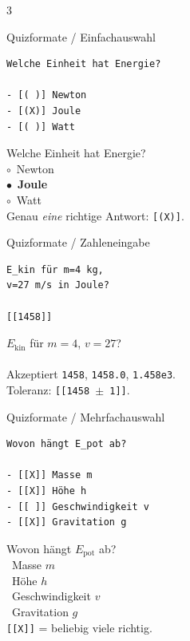 \documentclass[a4paper,landscape,9pt]{extarticle}
\newcommand{\prevsm}[1]{{\footnotesize\color{muted} #1}}
\begin{document}
\begin{multicols}{3}

\begin{liacard}{Quizformate / Einfachauswahl}
\begin{lstlisting}[language=lia]
Welche Einheit hat Energie?

- [( )] Newton
- [(X)] Joule
- [( )] Watt
\end{lstlisting}
\tcblower
\prevsm{Welche Einheit hat Energie?\\[2pt]
$\circ$~Newton\\
$\bullet$~\textbf{Joule}\\
$\circ$~Watt\\[2pt]
{\footnotesize Genau \emph{eine} richtige Antwort: \texttt{[(X)]}.}}
\end{liacard}

\begin{liacard}{Quizformate / Zahleneingabe}
\begin{lstlisting}[language=lia]
E_kin für m=4 kg,
v=27 m/s in Joule?

[[1458]]
\end{lstlisting}
\tcblower
\prevsm{$E_\text{kin}$ für $m=4$, $v=27$?\\[2pt]
\fbox{\strut\hspace{5em}}\\[3pt]
{\footnotesize Akzeptiert \texttt{1458}, \texttt{1458.0}, \texttt{1.458e3}.\\
Toleranz: \texttt{[[1458 $\pm$ 1]]}.}}
\end{liacard}

\begin{liacard}{Quizformate / Mehrfachauswahl}
\begin{lstlisting}[language=lia]
Wovon hängt E_pot ab?

- [[X]] Masse m
- [[X]] Höhe h
- [[ ]] Geschwindigkeit v
- [[X]] Gravitation g
\end{lstlisting}
\tcblower
\prevsm{Wovon hängt $E_\text{pot}$ ab?\\[2pt]
\faCheckSquare~Masse $m$\\
\faCheckSquare~Höhe $h$\\
\faSquare~Geschwindigkeit $v$\\
\faCheckSquare~Gravitation $g$\\[2pt]
{\footnotesize \texttt{[[X]]} = beliebig viele richtig.}}
\end{liacard}


\end{multicols}
\end{document}
